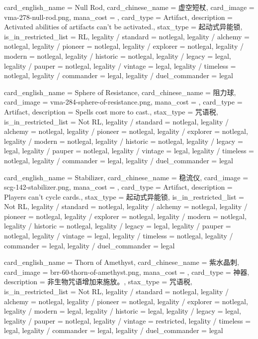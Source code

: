 \documentclass[lang = cn, color = black, 10pt]{AllThatStax}
\begin{document}
\card
{
	card_english_name = {Null Rod},
	card_chinese_name = {虚空短杖},
	card_image = vma-278-null-rod.png,
	mana_cost = ,
	card_type = Artifact,
	description = {Activated abilities of artifacts can't be activated.},
	stax_type = 起动式异能锁,
	is_in_restricted_list = RL,
	legality / standard = notlegal,
	legality / alchemy = notlegal,
	legality / pioneer = notlegal,
	legality / explorer = notlegal,
	legality / modern = notlegal,
	legality / historic = notlegal,
	legality / legacy = legal,
	legality / pauper = notlegal,
	legality / vintage = legal,
	legality / timeless = notlegal,
	legality / commander = legal,
	legality / duel_commander = legal
}

\card
{
	card_english_name = {Sphere of Resistance},
	card_chinese_name = {阻力球},
	card_image = vma-284-sphere-of-resistance.png,
	mana_cost = ,
	card_type = Artifact,
	description = {Spells cost  more to cast.},
	stax_type = 咒语税,
	is_in_restricted_list = Not RL,
	legality / standard = notlegal,
	legality / alchemy = notlegal,
	legality / pioneer = notlegal,
	legality / explorer = notlegal,
	legality / modern = notlegal,
	legality / historic = notlegal,
	legality / legacy = legal,
	legality / pauper = notlegal,
	legality / vintage = legal,
	legality / timeless = notlegal,
	legality / commander = legal,
	legality / duel_commander = legal
}

\card
{
	card_english_name = {Stabilizer},
	card_chinese_name = {稳流仪},
	card_image = scg-142-stabilizer.png,
	mana_cost = ,
	card_type = Artifact,
	description = {Players can't cycle cards.},
	stax_type = 起动式异能锁,
	is_in_restricted_list = Not RL,
	legality / standard = notlegal,
	legality / alchemy = notlegal,
	legality / pioneer = notlegal,
	legality / explorer = notlegal,
	legality / modern = notlegal,
	legality / historic = notlegal,
	legality / legacy = legal,
	legality / pauper = notlegal,
	legality / vintage = legal,
	legality / timeless = notlegal,
	legality / commander = legal,
	legality / duel_commander = legal
}

\card
{
	card_english_name = {Thorn of Amethyst},
	card_chinese_name = {紫水晶刺},
	card_image = brr-60-thorn-of-amethyst.png,
	mana_cost = ,
	card_type = 神器,
	description = {非生物咒语增加来施放。},
	stax_type = 咒语税,
	is_in_restricted_list = Not RL,
	legality / standard = notlegal,
	legality / alchemy = notlegal,
	legality / pioneer = notlegal,
	legality / explorer = notlegal,
	legality / modern = legal,
	legality / historic = legal,
	legality / legacy = legal,
	legality / pauper = notlegal,
	legality / vintage = restricted,
	legality / timeless = legal,
	legality / commander = legal,
	legality / duel_commander = legal
}
\end{document}
